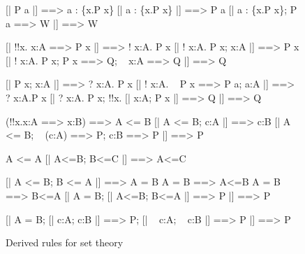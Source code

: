 \begin{figure} \underscoreon
\begin{ttbox}
        [| P a |] ==> a : \{x.P x\}
        [| a : \{x.P x\} |] ==> P a
        [| a : \{x.P x\};  P a ==> W |] ==> W

           [| !!x. x:A ==> P x |] ==> ! x:A. P x
           [| ! x:A. P x;  x:A |] ==> P x
           [| ! x:A. P x;  P x ==> Q;  ~ x:A ==> Q |] ==> Q

            [| P x;  x:A |] ==> ? x:A. P x
           [| ! x:A. ~ P x ==> P a;  a:A |] ==> ? x:A.P x
            [| ? x:A. P x;  !!x. [| x:A; P x |] ==> Q  |] ==> Q

         (!!x.x:A ==> x:B) ==> A <= B
         [| A <= B;  c:A |] ==> c:B
        [| A <= B;  ~ (c:A) ==> P;  c:B ==> P |] ==> P

     A <= A
    [| A<=B;  B<=C |] ==> A<=C

       [| A <= B;  B <= A |] ==> A = B
      A = B ==> A<=B
      A = B ==> B<=A
       [| A = B;  [| A<=B; B<=A |] ==> P |]  ==>  P

      [| A = B;  [| c:A; c:B |] ==> P;  
                           [| ~ c:A; ~ c:B |] ==> P 
                |]  ==>  P
\end{ttbox}
\caption{Derived rules for set theory} \label{chol-set1}
\end{figure}



